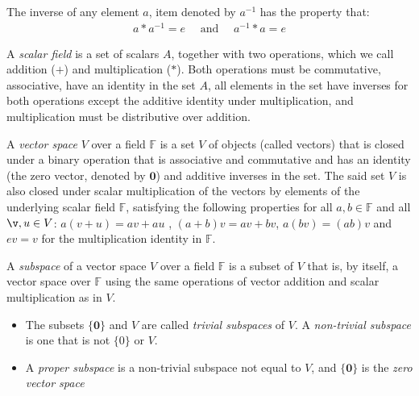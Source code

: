\begin{defns}[Inverses]
    The inverse of any element $a$, item denoted by $a^{-1}$ has the property that:
        \begin{align}
            a * a^{-1} = e  \quad\text{ and }\quad a^{-1} * a = e
        \end{align}
\end{defns}

\begin{defns}
    A \emph{scalar field} is a set of scalars $A$, together with two operations, which we call addition ($+$) and multiplication ($*$). Both operations must be commutative, associative, have an identity in the set $A$, all elements in the set have inverses for both operations except the additive identity under multiplication, and multiplication must be distributive over addition.
\end{defns}


\begin{defns}
    A \emph{vector space} $V$ over a field $\mathbb{F}$ is a set $V$ of objects (called vectors) that is closed under a binary operation that is associative and commutative and has an identity (the zero vector, denoted by $\mathbf{0}$) and additive inverses in the set. The said set $V$ is also closed under scalar multiplication of the vectors by elements of the underlying scalar field $\mathbb{F}$, satisfying the following properties for all $a, b \in \mathbb{F}$ and all $\v,u \in V$: $ a (v + u)  = av + au$ , $(a + b)v = av + bv$, $a(bv) = (ab)v$ and $e v = v$ for the multiplication identity in $\mathbb{F}$.
\end{defns}

\begin{defns}[Subspace]
 A \emph{subspace} of a vector space $V$ over a field $\mathbb{F}$ is a subset of $V$ that is, by itself, a vector space over $\mathbb{F}$ using the same operations of vector addition and scalar multiplication as in $V$.

 \begin{itemize}
     \item The subsets $\{\mathbf{0}\}$ and $V$ are called \emph{trivial subspaces} of $V$. A \emph{non-trivial subspace} is one that is not $\{0\}$ or $V$.
     \item A \emph{proper subspace} is a non-trivial subspace not equal to $V$, and $\{\mathbf{0}\}$ is the \emph{zero vector space}
 \end{itemize}
\end{defns}

